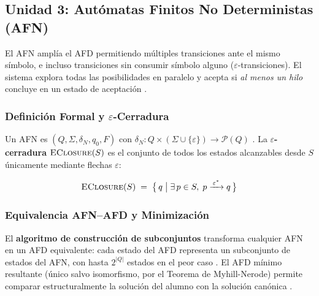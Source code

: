 \subsection*{Unidad 3: Autómatas Finitos No Deterministas (AFN)}

El AFN amplía el AFD permitiendo múltiples transiciones ante el mismo símbolo, e incluso
transiciones sin consumir símbolo alguno ($\varepsilon$-transiciones). El sistema explora todas las
posibilidades en paralelo y acepta si \emph{al menos un hilo} concluye en un estado de aceptación
\cite{sipser2012}.

\subsubsection*{Definición Formal y $\varepsilon$-Cerradura}

Un AFN es $(Q,\Sigma,\delta_N,q_0,F)$ con $\delta_N: Q \times (\Sigma\cup\{\varepsilon\}) \to
\mathcal{P}(Q)$ \cite{eugene2008}. La $\varepsilon$\textbf{-cerradura} $\textsc{EClosure}(S)$ es
el conjunto de todos los estados alcanzables desde $S$ únicamente mediante flechas $\varepsilon$:

\[
  \textsc{EClosure}(S) \;=\; \bigl\{\, q \;\big|\; \exists\, p \in S,\; p \xrightarrow{\,\varepsilon^*\,} q \,\bigr\}
\]

\subsubsection*{Equivalencia AFN–AFD y Minimización}

El \textbf{algoritmo de construcción de subconjuntos} transforma cualquier AFN en un AFD
equivalente: cada estado del AFD representa un subconjunto de estados del AFN, con hasta $2^{|Q|}$
estados en el peor caso \cite{hopcroft2007es}. El AFD mínimo resultante (único salvo isomorfismo,
por el Teorema de Myhill-Nerode) permite comparar estructuralmente la solución del alumno con la
solución canónica \cite{kelley2001}.

